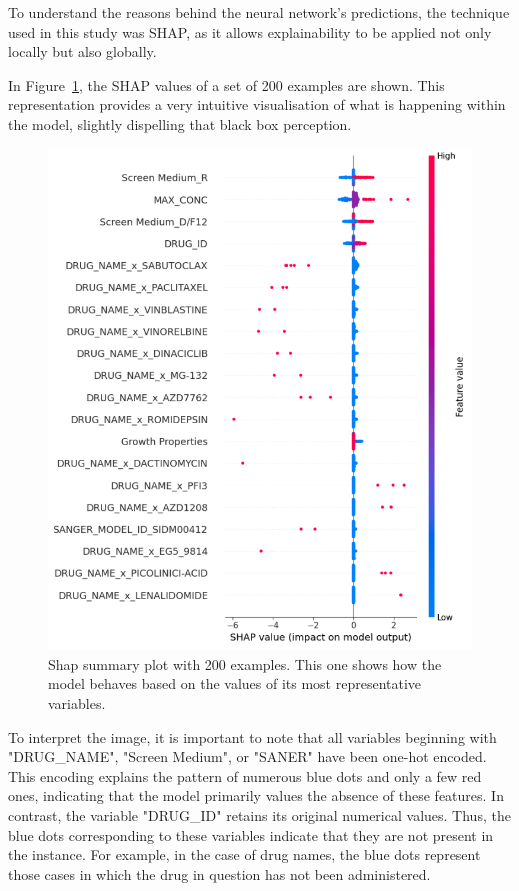To understand the reasons behind the neural network's predictions, the technique used in this study was SHAP, as it allows explainability to be applied not only locally but also globally.

In Figure~\ref{fig:shap_values}, the SHAP values of a set of 200 examples are shown. This representation provides a very intuitive visualisation of what is happening within the model, slightly dispelling that black box perception.

\begin{figure}[H]
    \centering
    \includegraphics[width=1\textwidth]{figures/shap/shap_values.png}
    \caption{Shap summary plot with 200 examples. This one shows how the model behaves based on the values of its most representative variables.}
    \label{fig:shap_values}
\end{figure}

To interpret the image, it is important to note that all variables beginning with "DRUG\_NAME", "Screen Medium", or "SANER" have been one-hot encoded. This encoding explains the pattern of numerous blue dots and only a few red ones, indicating that the model primarily values the absence of these features. In contrast, the variable "DRUG\_ID" retains its original numerical values. Thus, the blue dots corresponding to these variables indicate that they are not present in the instance. For example, in the case of drug names, the blue dots represent those cases in which the drug in question has not been administered.

